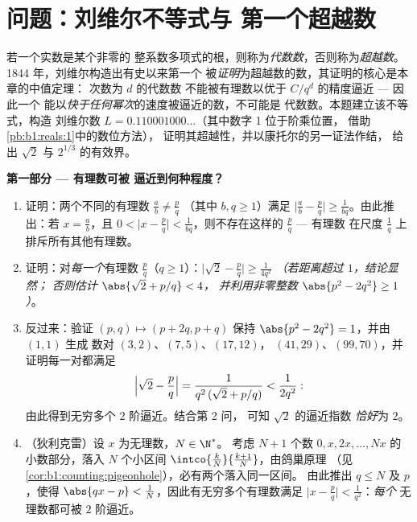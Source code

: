 \section{问题：刘维尔不等式与
第一个超越数}

\begin{problem}
\label{pb:b1:derivative:1}
若一个实数是某个非零的
整系数多项式的根，则称为\emph{代数数}，否则称为\emph{超越数}。
1844 年，刘维尔构造出有史以来第一个
被\emph{证明}为超越数的数，其证明的核心是本章的中值定理：
次数为 $d$ 的代数数
不能被有理数以优于 $C/q^d$ 的精度逼近 --- 因此一个
能以\emph{快于任何幂次}的速度被逼近的数，不可能是
代数数。本题建立该不等式，构造
刘维尔数 $L = 0.110001000\dots$（其中数字 1 位于阶乘位置，
借助\cref{pb:b1:reals:1}中的数位方法），
证明其超越性，并以康托尔的另一证法作结，
给出 $\sqrt2$ 与
$2^{1/3}$ 的有效界。

\medskip
\noindent\textbf{第一部分 --- 有理数可被
逼近到何种程度？}
\begin{enumerate}
  \item 证明：两个不同的有理数 $\frac ab \neq \frac pq$
        （其中 $b, q \geq 1$）满足 $\bigl|\frac ab -
        \frac pq\bigr| \geq \frac{1}{bq}$。由此推出：若 $x =
        \frac ab$，且 $0 < \bigl|x - \frac pq\bigr| <
        \frac{1}{bq}$，则不存在这样的 $\frac pq$ --- 有理数
        在尺度 $\frac 1q$ 上排斥所有其他有理数。
  \item 证明：对\emph{每一个}有理数 $\frac pq$（$q \geq
        1$）：$\bigl|\sqrt2 - \frac pq\bigr| \geq
        \frac{1}{4q^2}$ \emph{（若距离超过 $1$，结论显然；
        否则估计 $\abs{\sqrt2 + p/q} < 4$，
        并利用非零整数 $\abs{p^2 - 2q^2} \geq 1$）}。
  \item 反过来：验证 $(p, q) \mapsto (p +
        2q, p + q)$ 保持 $\abs{p^2 - 2q^2} = 1$，并由 $(1,1)$ 生成
        数对 $(3,2)$、$(7,5)$、$(17,12)$，
        $(41,29)$、$(99,70)$，并证明每一对都满足
        \[
        \Bigl|\sqrt2 - \frac pq\Bigr| =
        \frac{1}{q^2\,(\sqrt2 + p/q)} < \frac{1}{2q^2} :
        \]
        由此得到无穷多个 $2$ 阶逼近。结合第 2 问，
        可知 $\sqrt 2$ 的逼近指数
        \emph{恰好}为 $2$。
  \item （狄利克雷）设 $x$ 为无理数，$N \in \N^*$。
        考虑 $N + 1$ 个数 $0, x, 2x,
        \dots, Nx$ 的小数部分，落入 $N$ 个小区间 $\intco{\frac kN}{\frac{k +
        1}{N}}$，由鸽巢原理
        （见\cref{cor:b1:counting:pigeonhole}），必有两个落入同一区间。
        由此推出 $q \leq N$ 及 $p$，使得 $\abs{qx - p} <
        \frac 1N$，因此有无穷多个有理数满足
        $\bigl|x - \frac pq\bigr| < \frac{1}{q^2}$：\emph{每个}
        无理数都可被 $2$ 阶逼近。
\end{enumerate}


\end{problem}
